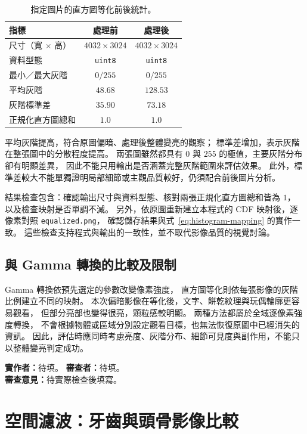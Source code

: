 \begin{table}[H]
  \centering
  \caption{指定圖片的直方圖等化前後統計。}
  \label{tab:histogram-statistics}
  \begin{tabular}{@{}lcc@{}}
    \toprule
    指標 & 處理前 & 處理後 \\
    \midrule
    尺寸（寬 $\times$ 高） & $4032\times3024$ & $4032\times3024$ \\
    資料型態 & \texttt{uint8} & \texttt{uint8} \\
    最小／最大灰階 & $0/255$ & $0/255$ \\
    平均灰階 & $48.68$ & $128.53$ \\
    灰階標準差 & $35.90$ & $73.18$ \\
    正規化直方圖總和 & $1.0$ & $1.0$ \\
    \bottomrule
  \end{tabular}
\end{table}

平均灰階提高，符合原圖偏暗、處理後整體變亮的觀察；
標準差增加，表示灰階在整張圖中的分散程度提高。
兩張圖雖然都具有 $0$ 與 $255$ 的極值，主要灰階分布卻有明顯差異，
因此不能只用輸出是否涵蓋完整灰階範圍來評估效果。
此外，標準差較大不能單獨證明局部細節或主觀品質較好，仍須配合前後圖片分析。

結果檢查包含：確認輸出尺寸與資料型態、核對兩張正規化直方圖總和皆為 $1$，
以及檢查映射是否單調不減。
另外，依原圖重新建立本程式的 CDF 映射後，逐像素對照 \texttt{equalized.png}，
確認儲存結果與式~\eqref{eq:histogram-mapping} 的實作一致。
這些檢查支持程式與輸出的一致性，並不取代影像品質的視覺討論。

\subsection{與 Gamma 轉換的比較及限制}

Gamma 轉換依預先選定的參數改變像素強度，
直方圖等化則依每張影像的灰階比例建立不同的映射。
本次偏暗影像在等化後，文字、餅乾紋理與玩偶輪廓更容易觀看，
但部分亮部也變得很亮，顆粒感較明顯。
兩種方法都屬於全域逐像素強度轉換，
不會根據物體或區域分別設定觀看目標，也無法恢復原圖中已經消失的資訊。
因此，評估時應同時考慮亮度、灰階分布、細節可見度與副作用，不能只以整體變亮判定成功。

\medskip
\noindent\textbf{實作者：}待填。\quad
\textbf{審查者：}待填。\\
\textbf{審查意見：}待實際檢查後填寫。

\clearpage
\section{空間濾波：牙齒與頭骨影像比較}
\label{sec:medical-comparison}

